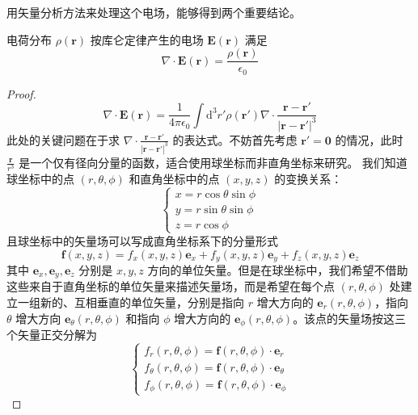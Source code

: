 \documentclass[cn,10pt,math=newtx,citestyle=gb7714-2015,bibstyle=gb7714-2015]{elegantbook}
\def\bm{\boldsymbol}
\def\d{\mathrm d}
\begin{document}
用矢量分析方法来处理这个电场，能够得到两个重要结论。
\begin{theorem}\label{thm:elctrc_fld_gss}
    电荷分布 $\rho(\bm r)$ 按库仑定律产生的电场 $\bm E(\bm r)$ 满足
    \begin{equation*}
        \nabla\cdot\bm E(\bm r)=\frac{\rho(\bm r)}{\epsilon_0}
    \end{equation*}
\end{theorem}
\begin{proof}
    \begin{equation}\label{eq:divE}
        \nabla\cdot\bm E(\bm r) = \frac{1}{4\pi\epsilon_0}\int\d^3 r'\rho(\bm r')\nabla\cdot\frac{\bm r-\bm r'}{|\bm r-\bm r'|^3}
    \end{equation}
    此处的关键问题在于求 $\nabla\cdot\frac{\bm r-\bm r'}{|\bm r-\bm r'|^3}$ 的表达式。不妨首先考虑 $\bm r'=\bm 0$ 的情况，此时 $\frac{\bm r}{r^3}$ 是一个仅有径向分量的函数，适合使用球坐标而非直角坐标来研究。
    我们知道球坐标中的点 $(r,\theta,\phi)$ 和直角坐标中的点 $(x,y,z)$ 的变换关系：
    \begin{equation}\label{eq:crtsn2sphrcl}
        \begin{cases}
            x=r\cos\theta\sin\phi\\
            y=r\sin\theta\sin\phi\\
            z=r\cos\phi
        \end{cases}
    \end{equation}
    且球坐标中的矢量场可以写成直角坐标系下的分量形式
    \begin{equation*}
        \bm f(x,y,z)=f_x(x,y,z)\bm e_x+f_y(x,y,z)\bm e_y+f_z(x,y,z)\bm e_z
    \end{equation*}
    其中 $\bm e_x,\bm e_y,\bm e_z$ 分别是 $x,y,z$ 方向的单位矢量。但是在球坐标中，我们希望不借助这些来自于直角坐标的单位矢量来描述矢量场，而是希望在每个点 $(r,\theta,\phi)$ 处建立一组新的、互相垂直的单位矢量，分别是指向 $r$ 增大方向的 $\bm e_r(r,\theta,\phi)$，指向 $\theta$ 增大方向 $\bm e_\theta(r,\theta,\phi)$ 和指向 $\phi$ 增大方向的 $\bm e_\phi(r,\theta,\phi)$。该点的矢量场按这三个矢量正交分解为
    \begin{equation*}
        \begin{cases}
            f_r(r,\theta,\phi) = \bm f(r,\theta,\phi)\cdot\bm e_r\\
            f_\theta(r,\theta,\phi) = \bm f(r,\theta,\phi)\cdot\bm e_\theta\\
            f_\phi(r,\theta,\phi) = \bm f(r,\theta,\phi)\cdot\bm e_\phi
        \end{cases}

\end{equation*}
\end{proof}
\end{document}
